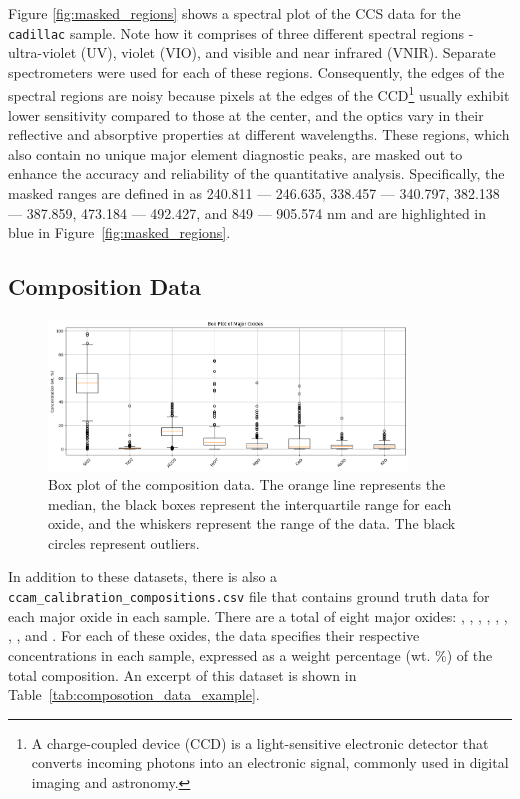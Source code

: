 Figure \ref{fig:masked_regions} shows a spectral plot of the CCS data for the \texttt{cadillac} sample.
Note how it comprises of three different spectral regions - ultra-violet (UV), violet (VIO), and visible and near infrared (VNIR).
Separate spectrometers were used for each of these regions.
Consequently, the edges of the spectral regions are noisy because pixels at the edges of the CCD\footnote{A charge-coupled device (CCD) is a light-sensitive electronic detector that converts incoming photons into an electronic signal, commonly used in digital imaging and astronomy\cite{radionuclide_imaging}.} usually exhibit lower sensitivity compared to those at the center, and the optics vary in their reflective and absorptive properties at different wavelengths.
These regions, which also contain no unique major element diagnostic peaks, are masked out to enhance the accuracy and reliability of the quantitative analysis\cite{cleggRecalibrationMarsScience2017}.
Specifically, the masked ranges are defined in \citet{cleggRecalibrationMarsScience2017} as 240.811 --- 246.635, 338.457 --- 340.797, 382.138 --- 387.859, 473.184 --- 492.427, and 849 --- 905.574 nm and are highlighted in blue in Figure~\ref{fig:masked_regions}.

\subsection{Composition Data}\label{subsec:composition_data}
\begin{figure}[t]
	\centering
	\includegraphics[width=0.85\textwidth]{images/composition_box_plot.png}
	\caption{Box plot of the composition data. The orange line represents the median, the black boxes represent the interquartile range for each oxide, and the whiskers represent the range of the data. The black circles represent outliers.}
	\label{fig:composition_box_plot}
\end{figure}

In addition to these datasets, there is also a \\ \texttt{ccam\_calibration\_compositions.csv} file that contains ground truth data for each major oxide in each sample.
There are a total of eight major oxides: , , , , , , , , and .
For each of these oxides, the data specifies their respective concentrations in each sample, expressed as a weight percentage (wt. \%) of the total composition.
An excerpt of this dataset is shown in Table~\ref{tab:composotion_data_example}.


